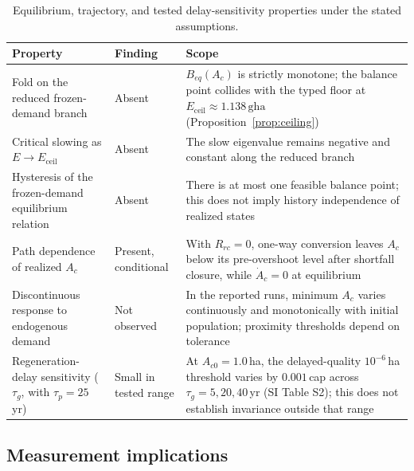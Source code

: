 \documentclass[preprint,12pt,authoryear]{elsarticle}
\newcommand{\Eceil}{E_{\mathrm{ceil}}}
\begin{document}
\begin{table}[!htbp]
\centering\footnotesize
\caption{Equilibrium, trajectory, and tested delay-sensitivity properties under the stated assumptions.}
\label{tab:neg}
\begin{tabularx}{\textwidth}{>{\raggedright\arraybackslash}p{} l >{\raggedright\arraybackslash}X}
\toprule
Property & Finding & Scope \\
\midrule
Fold on the reduced frozen-demand branch & Absent & $B_{eq}(A_c)$ is strictly monotone; the balance point collides with the typed floor at $\Eceil\approx1.138\,\mathrm{gha}$ (Proposition~\ref{prop:ceiling}) \\
Critical slowing as $E\to\Eceil$ & Absent & The slow eigenvalue remains negative and constant along the reduced branch \\
Hysteresis of the frozen-demand equilibrium relation & Absent & There is at most one feasible balance point; this does not imply history independence of realized states \\
Path dependence of realized $A_c$ & Present, conditional & With $R_{rc}=0$, one-way conversion leaves $A_c$ below its pre-overshoot level after shortfall closure, while $\dot A_c=0$ at equilibrium \\
Discontinuous response to endogenous demand & Not observed & In the reported runs, minimum $A_c$ varies continuously and monotonically with initial population; proximity thresholds depend on tolerance \\
Regeneration-delay sensitivity ($\tau_g$, with $\tau_p=25$\,yr) & Small in tested range & At $A_{c0}=1.0$\,ha, the delayed-quality $10^{-6}$\,ha threshold varies by $0.001$\,cap across $\tau_g=5,20,40$\,yr (SI Table S2); this does not establish invariance outside that range \\
\bottomrule
\end{tabularx}
\end{table}
\clearpage

\subsection{Measurement implications}
\end{document}
